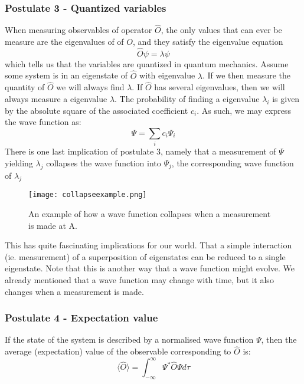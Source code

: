 \documentclass[12pt]{article}
\begin{document}
{\subsubsection*{Postulate 3 - Quantized variables}
When measuring observables of operator $\hat O$, the only values that can ever be measure are the eigenvalues of of $O$, and they satisfy the eigenvalue equation
\begin{equation*}
    \hat O \psi = \lambda \psi
\end{equation*}
which tells us that the variables are quantized in quantum mechanics.
\newline
Assume some system is in an eigenstate of $\hat O$ with eigenvalue $\lambda$. If we then measure the quantity of $\hat O$ we will always find $\lambda$. \newline
If $\hat O$ has several eigenvalues, then we will always measure a eigenvalue $\lambda$. The probability of finding a eigenvalue $\lambda_i$ is given by the absolute square of the associated coefficient $c_i$. As such, we may express the wave function as:
\begin{equation*}
    \Psi = \sum_i c_i \Psi _i
\end{equation*}
There is one last implication of postulate 3, namely that a measurement of $\Psi$ yielding $\lambda_j$ collapses the wave function into $\Psi_j$, the corresponding wave function of $\lambda_j$
\begin{figure}[ht!]
    \centering
    \texttt{[image: collapseexample.png]}
    \caption{An example of how a wave function collapses when a measurement is made at A.}
    \label{fig:collapse}
\end{figure}
\newline
This has quite fascinating implications for our world. That a simple interaction (ie. measurement) of a superposition of eigenstates can be reduced to a single eigenstate. Note that this is another way that a wave function might evolve. We already mentioned that a wave function may change with time, but it also changes when a measurement is made.
\subsubsection*{Postulate 4 - Expectation value}
If the state of the system is described by a normalised wave function $\Psi$, then the average (expectation) value of the observable corresponding to $\hat O$ is:
\begin{equation*}
    \langle \hat O \rangle = \int_{-\infty}^\infty \Psi^* \hat O \Psi d \tau
\end{equation*}
}
\end{document}
